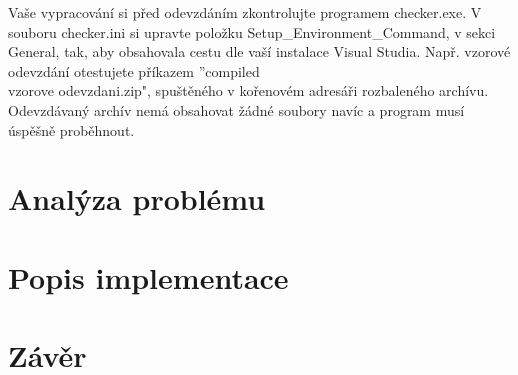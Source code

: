 \documentclass[ 12pt, a4paper]{article}
\begin{document}
Vaše vypracování si před odevzdáním zkontrolujte programem checker.exe. V souboru checker.ini si upravte položku Setup\_Environment\_Command, v sekci General, tak, aby obsahovala cestu dle vaší instalace Visual Studia. Např. vzorové odevzdání otestujete příkazem ''compiled\\vzorove odevzdani.zip", spuštěného v kořenovém adresáři rozbaleného archívu. Odevzdávaný archív nemá obsahovat žádné soubory navíc a program musí úspěšně proběhnout.


\newpage
\section{Analýza problému}\label{struktura}


\newpage
\section{Popis implementace}\label{prikazy}

\newpage
\section{Závěr} \label{diskuze}
\end{document}
